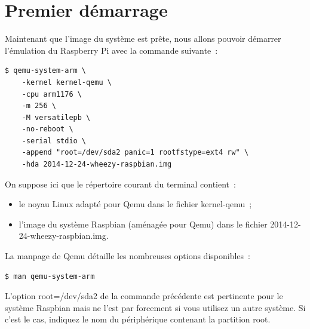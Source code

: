 \documentclass{article}
\begin{document}






\section{Premier démarrage}\label{sec:first-boot}

Maintenant que l'image du système est prête, nous allons pouvoir démarrer l'émulation du Raspberry Pi avec la commande suivante~:
\begin{verbatim}
$ qemu-system-arm \
    -kernel kernel-qemu \
    -cpu arm1176 \
    -m 256 \
    -M versatilepb \
    -no-reboot \
    -serial stdio \
    -append "root=/dev/sda2 panic=1 rootfstype=ext4 rw" \
    -hda 2014-12-24-wheezy-raspbian.img
\end{verbatim}

On suppose ici que le répertoire courant du terminal contient~:
\begin{itemize}
    \item le noyau Linux adapté pour Qemu dans le fichier \og{}kernel-qemu\fg{}~;
    \item l'image du système Raspbian (aménagée pour Qemu) dans le fichier \og{}2014-12-24-wheezy-raspbian.img\fg{}.
\end{itemize}

La manpage de Qemu détaille les nombreuses options disponibles~:
\begin{verbatim}
$ man qemu-system-arm
\end{verbatim}

L'option \og{}root=/dev/sda2\fg{} de la commande précédente est pertinente pour
le système Raspbian mais ne l'est par forcement si vous utilisez un autre
système. Si c'est le cas, indiquez le nom du périphérique contenant la
partition root.
\end{document}
